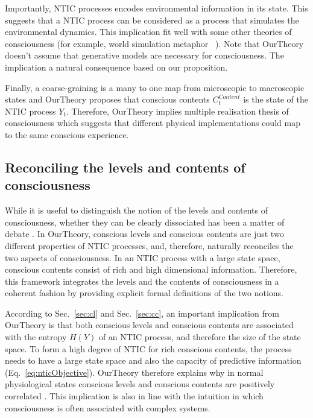 \documentclass[utf8]{article}
\begin{document}
    		Importantly, NTIC processes encodes environmental information in its state. This suggests that a NTIC process can be considered as a process that simulates the environmental dynamics. This implication fit well with some other theories of consciousness (for example, world simulation metaphor ~\citep{revonsuo2006inner}). Note that \ac{OurTheory} doesn't assume that generative models are necessary for consciousness. The implication a natural consequence based on our proposition. 
            
            Finally, a coarse-graining is a many to one map from microscopic to macroscopic states and \ac{OurTheory} proposes that conscious contents $C_{t}^{Content}$ is the state of the NTIC process $Y_t$. Therefore, \ac{OurTheory} implies multiple realisation thesis of consciousness \citep{putnam1967psychological,bechtel1999multiple} which suggests that different physical implementations could map to the same conscious experience.
            
            
	    \subsection{Reconciling the levels and contents of consciousness}\label{sec:reconcile}
    	    While it is useful to distinguish the notion of the  levels and contents of consciousness, whether they can be clearly dissociated has been a matter of debate \citep{bayne2016there, Fazekas2016}. In \ac{OurTheory}, conscious levels and conscious contents are just two different properties of NTIC processes, and, therefore, naturally reconciles the two aspects of consciousness. In an NTIC process with a large state space, conscious contents consist of rich and high dimensional information. Therefore, this framework integrates the levels and the contents of consciousness in a coherent fashion by providing explicit formal definitions of the two notions.  
    	    
    	    
    	    According to Sec.~\ref{sec:cl} and Sec.~\ref{sec:cc}, an important implication from \ac{OurTheory} is that both conscious levels and conscious contents are associated with the entropy $H(Y)$ of an NTIC process, and therefore the size of the state space. To form a high degree of NTIC for rich conscious contents, the process needs to have a large state space and also the capacity of predictive information   (Eq.~\ref{eq:nticObjective}).
    	    \ac{OurTheory} therefore explains why in normal physiological states conscious levels and conscious contents are positively correlated \citep{laureys2005neural}. This implication is also in line with the intuition in which consciousness is often associated with complex systems.
    			
\end{document}
